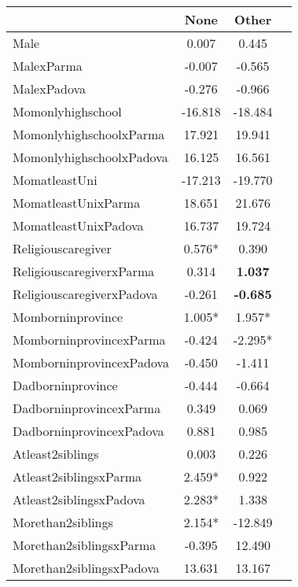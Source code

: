 \begin{tabular}{l c c c}
\toprule
& None & Other \\
\midrule
Male &     0.007 &     0.445 \\
MalexParma &    -0.007 &    -0.565 \\
MalexPadova &    -0.276 &    -0.966 \\
Momonlyhighschool &   -16.818 &   -18.484 \\
MomonlyhighschoolxParma &    17.921 &    19.941 \\
MomonlyhighschoolxPadova &    16.125 &    16.561 \\
MomatleastUni &   -17.213 &   -19.770 \\
MomatleastUnixParma &    18.651 &    21.676 \\
MomatleastUnixPadova &    16.737 &    19.724 \\
Religiouscaregiver & 0.576* &     0.390 \\
ReligiouscaregiverxParma &     0.314 & \textbf{    1.037} \\
ReligiouscaregiverxPadova &    -0.261 & \textbf{   -0.685} \\
Momborninprovince & 1.005* & 1.957* \\
MomborninprovincexParma &    -0.424 & -2.295* \\
MomborninprovincexPadova &    -0.450 &    -1.411 \\
Dadborninprovince &    -0.444 &    -0.664 \\
DadborninprovincexParma &     0.349 &     0.069 \\
DadborninprovincexPadova &     0.881 &     0.985 \\
Atleast2siblings &     0.003 &     0.226 \\
Atleast2siblingsxParma & 2.459* &     0.922 \\
Atleast2siblingsxPadova & 2.283* &     1.338 \\
Morethan2siblings & 2.154* &   -12.849 \\
Morethan2siblingsxParma &    -0.395 &    12.490 \\
Morethan2siblingsxPadova &    13.631 &    13.167 \\
\bottomrule
\end{tabular}
